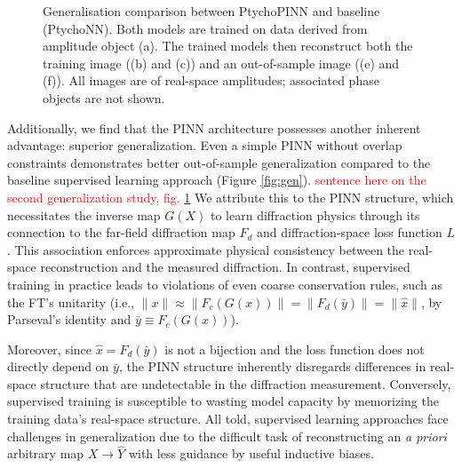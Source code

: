 \documentclass[sn-mathphys]{sn-jnl}%
\theoremstyle{thmstyleone}%
\theoremstyle{thmstyletwo}%
\theoremstyle{thmstylethree}%
\begin{document}

\begin{figure}%
    \centering
\vfill
    \caption{Generalisation comparison between PtychoPINN and baseline (PtychoNN). Both models are trained on data derived from amplitude object (a). The trained models then reconstruct both the training image ((b) and (c)) and an out-of-sample image ((e) and (f)). All images are of real-space amplitudes; associated phase objects are not shown.  }%
    \label{fig:gen_detailed}%
\end{figure}


Additionally, we find that the PINN architecture possesses another inherent advantage: superior generalization. Even a simple PINN without overlap constraints demonstrates better out-of-sample generalization compared to the baseline supervised learning approach (Figure \ref{fig:gen}). 
\textcolor{red}{sentence here on the second generalization study, fig. \ref{fig:gen_detailed}}
We attribute this to the PINN structure, which necessitates the inverse map $G(X)$ to learn diffraction physics through its connection to the far-field diffraction map $F_d$ and diffraction-space loss function $L$. This association enforces approximate physical consistency between the real-space reconstruction and the measured diffraction. In contrast, supervised training in practice leads to violations of even coarse conservation rules, such as the FT's unitarity (i.e., $\lVert x \rVert \approx \lVert F_c(G(x)) \rVert = \lVert F_d(\bar{y}) \rVert = \lVert \hat{x} \rVert$, by Parseval's identity and $\bar{y} \equiv F_c(G(x))$).


Moreover, since $\hat{x} = F_d(\bar{y})$ is not a bijection and the loss function does not directly depend on $\bar{y}$, the PINN structure inherently disregards differences in real-space structure that are undetectable in the diffraction measurement. Conversely, supervised training is susceptible to wasting model capacity by memorizing the training data's real-space structure. All told, supervised learning approaches face challenges in generalization due to the difficult task of reconstructing an \emph{a priori} arbitrary map $X \rightarrow \hat{Y}$ with less guidance by useful inductive biases.
\end{document}
